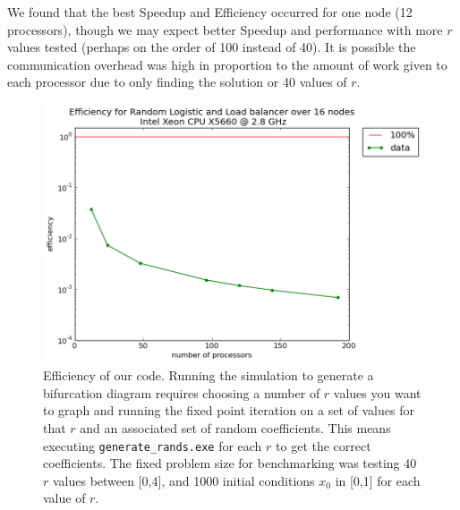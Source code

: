 \documentclass[12pt]{article}
\begin{document}
We found that the best Speedup and Efficiency occurred for one node
(12 processors), though we may expect better Speedup and performance
with more $r$ values tested (perhaps on the order of 100 instead of 40). It is possible the communication overhead was high in proportion to the amount of work given to each processor due to only finding the solution or 40 values of $r$.
\begin{figure}[H]
	\begin{center}
		\includegraphics[scale=0.5]{efficiency_random_logistic}
\caption{Efficiency of our code. Running the simulation to generate a bifurcation diagram requires choosing a number of $r$ values you want to graph and running the fixed point
  iteration on a set of values for that $r$ and an associated set of
  random coefficients. This means executing
  \texttt{generate\_rands.exe} for each $r$ to get the correct
  coefficients. The fixed problem size for benchmarking was testing 40
  $r$ values between [0,4], and 1000 initial conditions $x_0$ in [0,1]
  for each value of $r$.}
	\end{center}
\end{figure}
\end{document}
